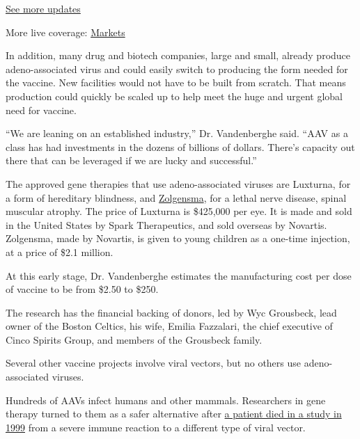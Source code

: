 \href{https://www.nytimes3xbfgragh.onion/2020/09/04/world/covid-19-coronavirus.html?action=click\&pgtype=Article\&state=default\&region=MAIN_CONTENT_1\&context=storylines_live_updates}{See
more updates}

More live coverage:
\href{https://www.nytimes3xbfgragh.onion/live/2020/09/04/business/stock-market-today-coronavirus?action=click\&pgtype=Article\&state=default\&region=MAIN_CONTENT_1\&context=storylines_live_updates}{Markets}

In addition, many drug and biotech companies, large and small, already
produce adeno-associated virus and could easily switch to producing the
form needed for the vaccine. New facilities would not have to be built
from scratch. That means production could quickly be scaled up to help
meet the huge and urgent global need for vaccine.

``We are leaning on an established industry,'' Dr. Vandenberghe said.
``AAV as a class has had investments in the dozens of billions of
dollars. There's capacity out there that can be leveraged if we are
lucky and successful.''

The approved gene therapies that use adeno-associated viruses are
Luxturna, for a form of hereditary blindness, and
\href{https://www.nytimes3xbfgragh.onion/2019/05/24/health/zolgensma-gene-therapy-drug.html}{Zolgensma},
for a lethal nerve disease, spinal muscular atrophy. The price of
Luxturna is \$425,000 per eye. It is made and sold in the United States
by Spark Therapeutics, and sold overseas by Novartis. Zolgensma, made by
Novartis, is given to young children as a one-time injection, at a price
of \$2.1 million.

At this early stage, Dr. Vandenberghe estimates the manufacturing cost
per dose of vaccine to be from \$2.50 to \$250.

The research has the financial backing of donors, led by Wyc Grousbeck,
lead owner of the Boston Celtics, his wife, Emilia Fazzalari, the chief
executive of Cinco Spirits Group, and members of the Grousbeck family.

Several other vaccine projects involve viral vectors, but no others use
adeno-associated viruses.

Hundreds of AAVs infect humans and other mammals. Researchers in gene
therapy turned to them as a safer alternative after
\href{https://www.sciencehistory.org/distillations/the-death-of-jesse-gelsinger-20-years-later}{a
patient died in a study in 1999} from a severe immune reaction to a
different type of viral vector.

